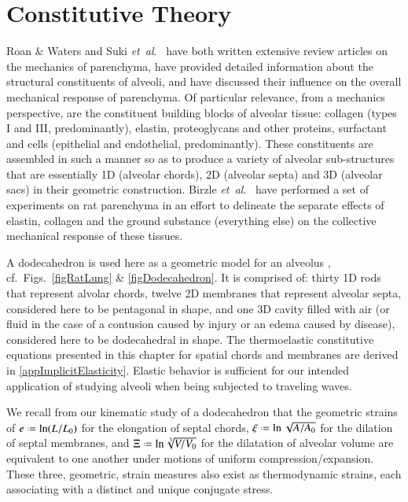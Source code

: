 \part{Constitutive Theory}
\label{partConstitutive}

Roan \& Waters \cite{RoanWaters11} and Suki \textit{et~al}.\ \cite{Sukietal05,Sukietal11} have both written extensive review articles on the mechanics of parenchyma, have provided detailed information about the structural constituents of alveoli, and have discussed their influence on the overall mechanical response of parenchyma.  Of particular relevance, from a mechanics perspective, are the constituent building blocks of alveolar tissue: collagen (types I and III, predominantly), elastin, proteoglycans and other proteins, surfactant and cells (epithelial and endothelial, predominantly).  These constituents are assembled in such a manner so as to produce a variety of alveolar sub-structures that are essentially 1D (alveolar chords), 2D (alveolar septa) and 3D (alveolar sacs) in their geometric construction.  Birzle \textit{et~al}.\ \cite{Birzleetal19} have performed a set of experiments on rat parenchyma in an effort to delineate the separate effects of elastin, collagen and the ground substance (everything else) on the collective mechanical response of these tissues.

A dodecahedron is used here as a geometric model for an alveolus \cite{FrankusLee74}, cf.\ Figs.~\ref{figRatLung} \& \ref{figDodecahedron}.  It is comprised of: thirty 1D rods that represent alvolar chords, twelve 2D membranes that represent alveolar septa, considered here to be pentagonal in shape, and one 3D cavity filled with air (or fluid in the case of a contusion caused by injury or an edema caused by disease), considered here to be dodecahedral in shape.  The thermo\-elastic constitutive equations presented in this chapter for spatial chords and membranes are derived in \ref{appImplicitElasticity}.  Elastic behavior is sufficient for our intended application of studying alveoli when being subjected to traveling waves.

We recall from our kinematic study of a dodecahedron that the geometric strains of $e \defeq \ln ( L / L_0 )$ for the elongation of septal chords, $\xi \defeq \ln \sqrt{A / A_0}$ for the dilation of septal membranes, and $\Xi \defeq \ln \sqrt[3]{V / V_0}$ for the dilatation of alveolar volume are equivalent to one another under motions of uniform compression\slash expansion.  These three, geometric, strain measures also exist as thermo\-dynamic strains, each associating with a distinct and unique conjugate stress.

